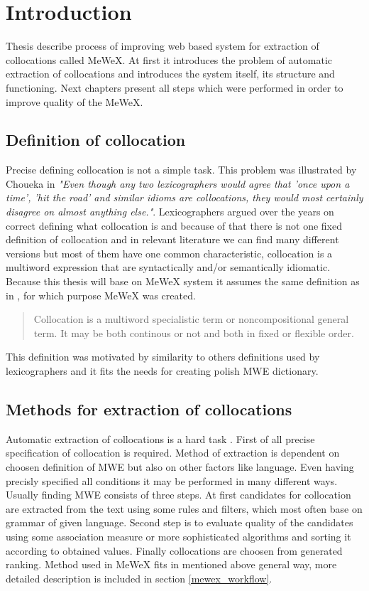 
\chapter{Introduction}
Thesis describe process of improving web based system for extraction of collocations called MeWeX. 
At first it introduces the problem of automatic extraction of collocations and introduces the system itself, 
its structure and functioning. Next chapters present all steps which were performed in order to improve quality of the MeWeX.

\section{Definition of collocation}\label{col_def}
Precise defining collocation is not a simple task. This problem was illustrated by Choueka in \cite{evert} 
\textit{"Even though any two lexicographers would agree that ’once upon a time’, ’hit the road’ and similar idioms are collocations,
they would most certainly disagree on almost anything else."}.
Lexicographers argued over the years on correct defining what collocation is and because of that there is not one fixed definition of collocation  
and in relevant literature we can find many different versions but most of them have one common characteristic, 
collocation is a multiword expression that are syntactically and/or semantically idiomatic. Because this thesis will base on MeWeX system 
it assumes the same definition as in \cite{mgr}, for which purpose MeWeX was created.
\begin{quote}
    Collocation is a multiword specialistic term or noncompositional general term. 
    It may be both continous or not and both in fixed or flexible order.
\end{quote}
This definition was motivated by similarity to others definitions used by lexicographers and it fits the needs for creating polish MWE dictionary. 

\section{Methods for extraction of collocations} \label{extraction_method}
Automatic extraction of collocations is a hard task \cite[c.1,2]{ramisch}. First of all precise specification of collocation is required.
Method of extraction is dependent on choosen definition of MWE but also on other factors like language. 
Even having precisly specified all conditions it may be performed in many different ways. 
Usually finding MWE consists of three steps. At first candidates for collocation are extracted from the text using some rules and filters, 
which most often base on grammar of given language. Second step is to evaluate quality of the candidates 
using some association measure or more sophisticated algorithms and sorting it according to obtained values. 
Finally collocations are choosen from generated ranking. Method used in MeWeX fits in mentioned above general way, 
more detailed description is included in section \ref{mewex_workflow}.

